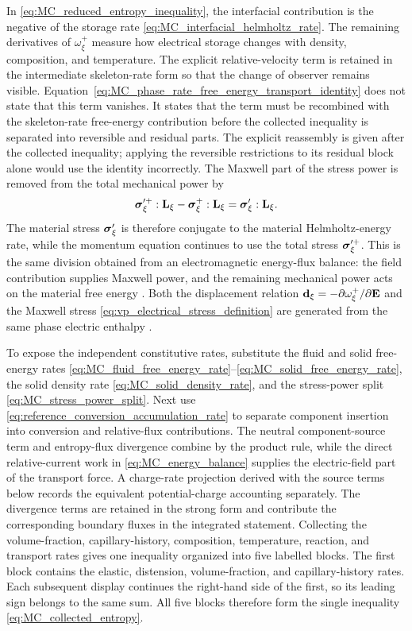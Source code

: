 In \eqref{eq:MC_reduced_entropy_inequality}, the interfacial contribution is the
negative of the storage rate
\eqref{eq:MC_interfacial_helmholtz_rate}.  The remaining derivatives of
\(\omega_\xi^+\) measure how electrical storage changes with density,
composition, and temperature.  The explicit relative-velocity term is retained
in the intermediate skeleton-rate form so that the change of observer remains
visible.  Equation~\eqref{eq:MC_phase_rate_free_energy_transport_identity} does
not state that this term vanishes.  It states that the term must be recombined
with the skeleton-rate free-energy contribution before the collected inequality
is separated into reversible and residual parts.  The explicit reassembly is
given after the collected inequality; applying the reversible restrictions to
its residual block alone would use the identity incorrectly.
The Maxwell part of the stress power is removed
from the total mechanical power by
\begin{equation}
	\boldsymbol{\sigma}_\xi^{\prime+}:\mathbf{L}_\xi
	-
	\boldsymbol{\sigma}_\xi^+:\mathbf{L}_\xi
	=
	\boldsymbol{\sigma}_\xi':\mathbf{L}_\xi .
	\label{eq:MC_material_stress_power_identity}
\end{equation}
The material stress \(\boldsymbol{\sigma}_\xi'\) is therefore conjugate to the material
Helmholtz-energy rate, while the momentum equation continues to use the total
stress \(\boldsymbol{\sigma}_\xi^{\prime+}\).  This is the same division obtained from an
electromagnetic energy-flux balance: the field contribution supplies Maxwell
power, and the remaining mechanical power acts on the material free energy
\cite{nika2025heterogeneous_dielectrics}.  Both the displacement relation
\(\mathbf{d}_\xi=-\partial\omega_\xi^+/\partial\mathbf{E}\) and the Maxwell stress
\eqref{eq:vp_electrical_stress_definition} are generated from the same phase
electric enthalpy \cite{dorfmann2017nonlinear_electroelasticity}.

To expose the independent constitutive rates, substitute the fluid and solid
free-energy rates
\eqref{eq:MC_fluid_free_energy_rate}--\eqref{eq:MC_solid_free_energy_rate}, the
solid density rate \eqref{eq:MC_solid_density_rate}, and the stress-power split
\eqref{eq:MC_stress_power_split}.  Next use
\eqref{eq:reference_conversion_accumulation_rate} to separate component
insertion into conversion and relative-flux contributions.  The neutral
component-source term and entropy-flux divergence combine by the product rule,
while the direct relative-current work in \eqref{eq:MC_energy_balance} supplies
the electric-field part of the transport force.  A charge-rate projection
derived with the source terms below records the equivalent potential-charge
accounting separately.
The divergence terms are retained in the strong form and contribute the
corresponding boundary fluxes in the integrated statement.
Collecting the volume-fraction, capillary-history, composition, temperature,
reaction, and transport rates gives one inequality organized into five labelled
blocks.  The first block contains the elastic, distension, volume-fraction, and
capillary-history rates.  Each subsequent display continues the
right-hand side of the first, so its leading sign belongs to the same sum.  All
five blocks therefore form the single inequality
\eqref{eq:MC_collected_entropy}.

